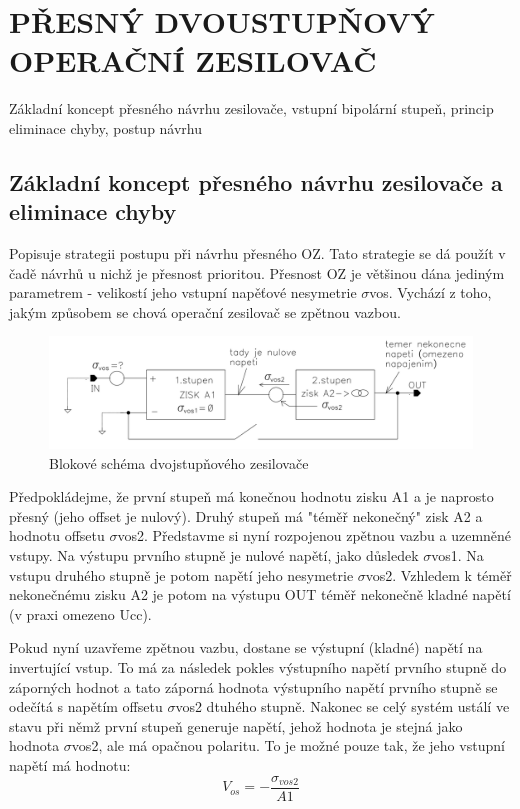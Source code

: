 \section{PŘESNÝ DVOUSTUPŇOVÝ OPERAČNÍ ZESILOVAČ}
Základní koncept přesného návrhu zesilovače, vstupní bipolární stupeň, princip eliminace chyby, postup návrhu

\subsection{Základní koncept přesného návrhu zesilovače a eliminace chyby}
Popisuje strategii postupu při návrhu přesného OZ. Tato strategie se dá použít v čadě návrhů u nichž je přesnost prioritou. Přesnost OZ je většinou dána jediným parametrem - velikostí jeho vstupní napěťové nesymetrie $\sigma$vos. Vychází z toho, jakým způsobem se chová operační zesilovač se zpětnou vazbou.

\begin{figure}[h]
   \begin{center}
     \includegraphics[scale=0.5]{images/dvojOZ.png}
   \end{center}
   \caption{Blokové schéma dvojstupňového zesilovače}
\end{figure}

Předpokládejme, že první stupeň má konečnou hodnotu zisku A1 a je naprosto přesný (jeho offset je nulový). Druhý stupeň má "téměř nekonečný" zisk A2 a hodnotu offsetu $\sigma$vos2. Představme si nyní rozpojenou zpětnou vazbu a uzemněné vstupy. Na výstupu prvního stupně je nulové napětí, jako důsledek $\sigma$vos1. Na vstupu druhého stupně je potom napětí jeho nesymetrie $\sigma$vos2. Vzhledem k téměř nekonečnému zisku A2 je potom na výstupu OUT téměř nekonečně kladné napětí (v praxi omezeno Ucc). 

Pokud nyní uzavřeme zpětnou vazbu, dostane se výstupní (kladné) napětí na invertující vstup. To má za následek pokles výstupního napětí prvního stupně do záporných hodnot a tato záporná hodnota výstupního napětí prvního stupně se odečítá s napětím offsetu $\sigma$vos2 dtuhého stupně. Nakonec se celý systém ustálí ve stavu při němž první stupeň generuje napětí, jehož hodnota je stejná jako hodnota $\sigma$vos2, ale má opačnou polaritu. To je možné pouze tak, že jeho vstupní napětí má hodnotu:
\begin{equation}
V_{os} = -\frac{\sigma_{vos2}}{A1}
\end{equation}

